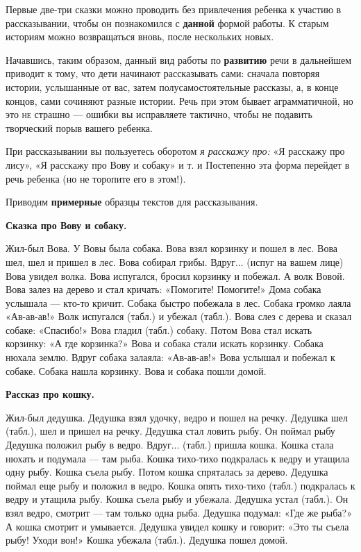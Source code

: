 \documentclass[a5paper]{book}
\renewcommand{\emph}[1]{\textit{#1}}
\begin{document}
Первые две-три сказки можно проводить без привлечения ребенка к участию
в рассказывании, чтобы он познакомился с \textbf{данной} формой работы.
К старым историям можно возвращаться вновь, после нескольких новых.

Начавшись, таким образом, данный вид работы по \textbf{развитию} речи в
дальнейшем приводит к тому, что дети начинают рассказывать сами: сначала
повторяя истории, услышанные от вас, затем полусамостоятельные рассказы,
а, в конце концов, сами сочиняют разные истории. Речь при этом бывает
аграмматичной, но это \textsc{не} страшно --- ошибки вы исправляете
тактично, чтобы не подавить творческий порыв вашего ребенка.

При рассказывании вы пользуетесь оборотом \emph{я расскажу про:} «Я
расскажу про лису», «Я расскажу про Вову и собаку» и т. и Постепенно эта
форма перейдет в речь ребенка (но не торопите его в этом!).

Приводим \textbf{примерные} образцы текстов для рассказывания.

\textbf{Сказка про Вову и собаку.}

Жил-был Вова. У Вовы была собака. Вова взял корзинку и пошел в лес. Вова
шел, шел и пришел в лес. Вова собирал грибы. Вдруг... (испуг на вашем
лице) Вова увидел волка. Вова испугался, бросил корзинку и побежал. А
волк Вовой. Вова залез на дерево и стал кричать: «Помогите! Помогите!»
Дома собака услышала --- кто-то кричит. Собака быстро побежала в лес.
Собака громко лаяла «Ав-ав-ав!» Волк испугался (табл.) и убежал (табл.).
Вова слез с дерева и сказал собаке: «Спасибо!» Вова гладил (табл.)
собаку. Потом Вова стал искать корзинку: «А где корзинка?» Вова и собака
стали искать корзинку. Собака нюхала землю. Вдруг собака залаяла:
«Ав-ав-ав!» Вова услышал и побежал к собаке. Собака нашла корзинку. Вова
и собака пошли домой.

\textbf{Рассказ про кошку.}

Жил-был дедушка. Дедушка взял удочку, ведро и пошел на речку. Дедушка
шел (табл.), шел и пришел на речку. Дедушка стал ловить рыбу. Он поймал
рыбу Дедушка положил рыбу в ведро. Вдруг... (табл.) пришла кошка. Кошка
стала нюхать и подумала --- там рыба. Кошка тихо-тихо подкралась к ведру
и утащила одну рыбу. Кошка съела рыбу. Потом кошка спряталась за дерево.
Дедушка поймал еще рыбу и положил в ведро. Кошка опять тихо-тихо (табл.)
подкралась к ведру и утащила рыбу. Кошка съела рыбу и убежала. Дедушка
устал (табл.). Он взял ведро, смотрит --- там только одна рыба. Дедушка
подумал: «Где же рыба?» А кошка смотрит и умывается. Дедушка увидел
кошку и говорит: «Это ты съела рыбу! Уходи вон!» Кошка убежала (табл.).
Дедушка пошел домой.
\end{document}

